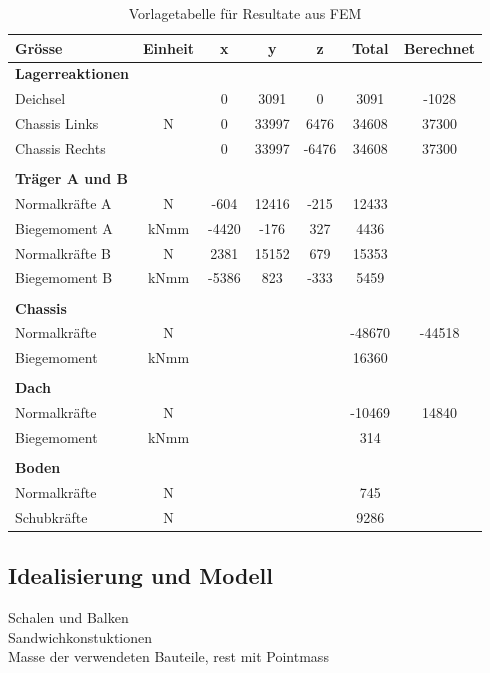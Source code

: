 \begin{table}[h!]
\centering
\begin{tabular}{lcccccc}
Grösse	&	Einheit	&	x	&	y	&	z	&	Total	&	Berechnet	\\	\hline
\textbf{Lagerreaktionen}	&		&		&		&		&		&		\\	\thickhline
Deichsel	&		&	0	&	3091	&	0	&	3091	&	-1028	\\
Chassis Links	&	N	&	0	&	33997	&	6476	&	34608	&	37300	\\
Chassis Rechts	&		&	0	&	33997	&	-6476	&	34608	&	37300	\\	\hline	\\
\textbf{Träger A und B}	&		&		&		&		&		&		\\	\thickhline
Normalkräfte A	&	N	&	-604	&	12416	&	-215	&	12433	&		\\
Biegemoment A	&	kNmm	&	-4420	&	-176	&	327	&	4436	&		\\
Normalkräfte B	&	N	&	2381	&	15152	&	679	&	15353	&		\\
Biegemoment B	&	kNmm	&	-5386	&	823	&	-333	&	5459	&		\\	\hline	\\
\textbf{Chassis}	&		&		&		&		&		&		\\	\thickhline
Normalkräfte	&	N	&		&		&		&	-48670	&	-44518	\\
Biegemoment	&	kNmm	&		&		&		&	16360	&		\\	\hline	\\
\textbf{Dach}	&		&		&		&		&		&		\\	\thickhline
Normalkräfte	&	N	&		&		&		&	-10469	&	14840	\\
Biegemoment	&	kNmm	&		&		&		&	314	&		\\	\hline	\\
\textbf{Boden}	&		&		&		&		&		&		\\	\thickhline
Normalkräfte	&	N	&		&		&		&	745	&		\\
Schubkräfte	&	N	&		&		&		&	9286	&		\\	\hline
\end{tabular}
\caption{Vorlagetabelle für Resultate aus FEM}%
\label{Resultate Vorlage}
\end{table}











\subsection{Idealisierung und Modell}
Schalen und Balken\\
Sandwichkonstuktionen\\
Masse der verwendeten Bauteile, rest mit Pointmass\\

